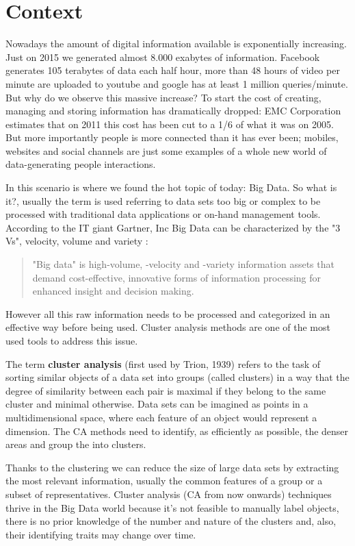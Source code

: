 \section{Context}


Nowadays the amount of digital information available is exponentially increasing. Just on 2015 we generated almost 8.000 exabytes of information. Facebook generates 105 terabytes of data each half hour, more than 48 hours of video per minute are uploaded to youtube and google has at least 1 million queries/minute. But why do we observe this massive increase? To start the cost of creating, managing and storing information has dramatically dropped: EMC Corporation estimates that on 2011 this cost has been cut to a 1/6 of what it was on 2005. But more importantly people is more connected than it has ever been; mobiles, websites and social channels are just some examples of a whole new world of data-generating people interactions. 

In this scenario is where we found the hot topic of today: Big Data. So what is it?, usually the term is used referring to data sets too big or complex to be processed with traditional data applications or on-hand management tools. According to the IT giant Gartner, Inc Big Data can be characterized by the "3 Vs", velocity, volume and variety \cite{Laney}:

\begin{quotation}
"Big data" is high-volume, -velocity and -variety information assets that demand cost-effective, innovative forms of information processing for enhanced insight and decision making.
\end{quotation}


However all this raw information needs to be processed and categorized in an effective way before being used. Cluster analysis methods are one of the most used tools to address this issue. 

The term \textbf{cluster analysis} (first used by Trion, 1939) refers to the task of sorting similar objects of a data set into groups (called clusters) in a way that the degree of similarity between each pair is maximal if they belong to the same cluster and minimal otherwise. Data sets can be imagined as points in a multidimensional space, where each feature of an object would represent a dimension. The CA methods need to identify, as efficiently as possible, the denser areas and group the into clusters.

Thanks to the clustering we can reduce the size of large data sets by extracting the most relevant information, usually the common features of a group or a subset of representatives. Cluster analysis (CA from now onwards) techniques thrive in the Big Data world because it's not feasible to manually label objects, there is no prior knowledge of the number and nature of the clusters and, also, their identifying traits may change over time. 

